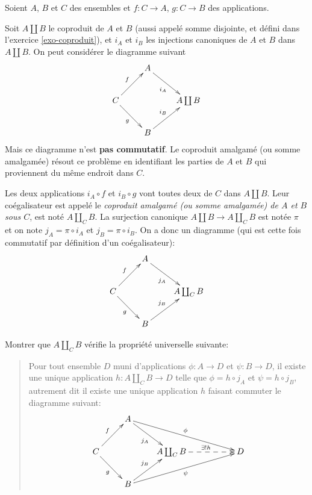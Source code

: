 \begin{exercice}
Soient $A$,  $B$ et $C$  des ensembles et $f :  C\to A$, $g : C\to B$ des applications.

Soit $A\coprod B$ le coproduit de $A$ et $B$ (aussi appelé somme disjointe, et défini dans l'exercice \ref{exo-coproduit}), et $i_A$ et $i_B$ les injections canoniques de $A$ et $B$ dans $A\coprod B$. On peut considérer le diagramme suivant
\[ 
\xymatrix{
&A \ar[dr]_{i_A} &   \\
C\ar[ur]^f\ar[dr]_g& &  A\coprod B    \\
& B \ar[ur]^{i_B} & 
}\]
Mais ce diagramme n'est \textbf{pas commutatif}. Le coproduit amalgamé (ou somme amalgamée) résout ce problème en \og identifiant les parties de $A$ et $B$ qui proviennent du même endroit dans $C$\fg{}.


Les deux applications $i_A \circ f$ et $i_B \circ g$ vont toutes deux de $C$ dans $A\coprod B$.  Leur coégalisateur est appelé le \emph{coproduit amalgamé (ou somme amalgamée) de $A$ et $B$  sous $C$}, est noté $A\coprod_C B$. La surjection canonique  $A\coprod B \to A\coprod_C B$ est notée $\pi$ et on note $j_A = \pi \circ i_A$ et $j_B = \pi \circ i_B$. On a donc un diagramme (qui est cette fois commutatif par définition d'un coégalisateur):
\[ 
\xymatrix{
&A \ar[dr]_{j_A} &   \\
C\ar[ur]^f\ar[dr]_g& &  A\coprod_C B    \\
& B \ar[ur]^{j_B} & 
}\]

Montrer que $A\coprod_C B$ vérifie la propriété universelle suivante:
\begin{quote}
Pour tout ensemble  $D$ muni d'applications $\phi : A\to D$ et $\psi : B\to D$, il existe une unique application $h : A\coprod_C B \to D$ telle que $\phi = h\circ j_A$ et $\psi = h\circ j_B$, autrement dit il existe une unique application $h$ faisant commuter le diagramme  suivant:
\[ 
\xymatrix{
&A \ar[dr]_{j_A} \ar[drrr]^{\phi}& & & \\
C\ar[ur]^f\ar[dr]_g& &  A\coprod_C B \ar@{-->}[rr]^{\exists !h}  & & D\\
& B \ar[ur]^{j_B} \ar[urrr]_{\psi}& & &
}\]
\end{quote}
\end{exercice}

